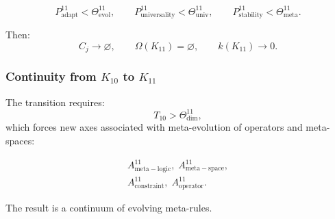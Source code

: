 \[
   P^{11}_{\mathrm{adapt}} < \Theta^{11}_{\mathrm{evol}},\qquad
   P^{11}_{\mathrm{universality}} < \Theta^{11}_{\mathrm{univ}},\qquad
   P^{11}_{\mathrm{stability}} < \Theta^{11}_{\mathrm{meta}}.
\]

Then:
\[
  C_j\to\varnothing,\qquad
  \Omega(K_{11})=\varnothing,\qquad
  k(K_{11})\to 0.
\]


\subsubsection{Continuity from $K_{10}$ to $K_{11}$}

The transition requires:
\[
  T_{10}>\Theta^{11}_{\mathrm{dim}},
\]
which forces new axes associated with meta-evolution of operators and
meta-spaces:

\[
  \begin{aligned}
  A^{11}_{\mathrm{meta\!-\!logic}},\;
  A^{11}_{\mathrm{meta\!-\!space}},\\
  A^{11}_{\mathrm{constraint}},\;
  A^{11}_{\mathrm{operator}}.
  \end{aligned}
\]

The result is a continuum of evolving meta-rules.
